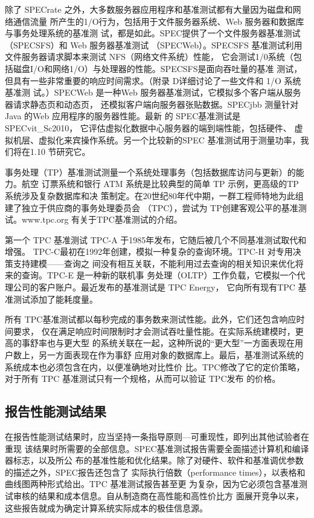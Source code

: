 除了 SPECrate 之外，大多数服务器应用程序和基准测试都有大量因为磁盘和网络通信流量
所产生的1/O行为，包括用于文件服务器系统、Web 服务器和数据库与事务处理系统的基准测
试，都是如此。SPEC提供了一个文件服务器基准测试（SPECSFS）和 Web 服务器基准测试
（SPECWeb）。SPECSFS 基准测试利用文件服务器请求脚本来测试 NFS（网络文件系统）性能，
它会测试1/0系统（包括磁盘I/O和网络1/O）与处理器的性能。SPECSFS是面向吞吐量的基准
测试，但具有一些非常重要的响应时间需求。（附录 D详细讨论了一些文件和 1/O 系统基准测
试。）SPECWeb 是一种Web 服务器基准测试，它模拟多个客户端从服务器请求静态页和动态页，
还模拟客户端向服务器张贴数据。SPECjbb 测量针对Java 的Web 应用程序的服务器性能。最新
的 SPEC基准测试是SPECvit\_Sc2010， 它评估虚拟化数据中心服务器的端到端性能，包括硬件、
虚拟机层、虚拟化来宾操作系统。另一个比较新的SPEC 基准测试用于测量功率，我们将在1.10
节研究它。

事务处理（TP）基准测试测量一个系统处理事务（包括数据库访问与更新）的能力。航空
订票系统和银行 ATM 系统是比较典型的简单 TP 示例，更高级的TP 系统涉及复杂数据库和决
策制定。在20世纪80年代中期，一群工程师特地为此组建了独立于供应商的事务处理委员会
（TPC），尝试为 TP创建客观公平的基准测试。www.tpc.org 有关于TPC基准测试的介绍。

第一个 TPC 基准测试 TPC-A 于1985年发布，它随后被几个不同基准测试取代和增强。
TPC-C最初在1992年创建，模拟一种复杂的查询环境。TPC-H 对专用决策支持建模——查询之
间没有相互关联，不能利用过去查询的相关知识来优化将来的查询。TPC-E 是一种新的联机事
务处理（OLTP）工作负载，它模拟一个代理公司的客户账户。最近发布的基准测试是 TPC Energy，
它向所有现有TPC 基准测试添加了能耗度量。

所有 TPC基准测试都以每秒完成的事务数来测试性能。此外，它们还包含响应时间要求，
仅在满足响应时间限制时才会测试吞吐量性能。在实际系统建模时，更高的事舒率也与更大型
的系统关联在一起，这种所说的“更大型”一方面表现在用户数上，另一方面表现在作为事舒
应用对象的数据库上。最后，基准测试系统的系统成本也必须包含在内，以便准确地对比性价
比。TPC修改了它的定价策略，对于所有 TPC 基准测试只有一个规格，从而可以验证 TPC发布
的价格。

\subsection{报告性能测试结果}
在报告性能测试结果时，应当坚持一条指导原则—可重现性，即列出其他试验者在重现
该结果时所需要的全部信息。SPEC基准测试报告需要全面描述计算机和编译器标志，以及所公
布的基准性能和优化结果。除了对硬件、软件和基准调优参数的描述之外，SPEC报告还包含了
实际执行倍数（performance times），以表格和曲线图两种形式给出。TPC 基准测试报告甚至更
为复杂，因为它必须包含基准测试审核的结果和成本信息。自从制造商在高性能和高性价比方
面展开竞争以来，这些报告就成为确定计算系统实际成本的极佳信息源。

